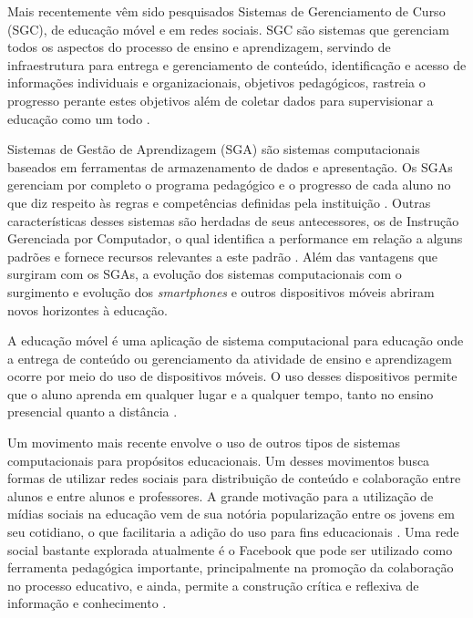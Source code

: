 Mais recentemente vêm sido pesquisados Sistemas de Gerenciamento de Curso (SGC), de educação móvel e em redes sociais. SGC são sistemas que gerenciam todos os aspectos do processo de ensino e aprendizagem, servindo de infraestrutura para entrega e gerenciamento de conteúdo, identificação e acesso de informações individuais e organizacionais, objetivos pedagógicos, rastreia o progresso perante estes objetivos além de coletar dados para supervisionar a educação como um todo \cite{flescher02}.

Sistemas de Gestão de Aprendizagem (SGA) são sistemas computacionais baseados em ferramentas de armazenamento de dados e apresentação. Os SGAs gerenciam por completo o programa pedagógico e o progresso de cada aluno no que diz respeito às regras e competências definidas pela instituição \cite{flescher02}. Outras características desses sistemas são herdadas de seus antecessores, os de Instrução Gerenciada por Computador, o qual identifica a performance em relação a alguns padrões e fornece recursos relevantes a este padrão \cite{flescher02}. Além das vantagens que surgiram com os SGAs, a evolução dos sistemas computacionais com o surgimento e evolução dos \emph{smartphones} e outros dispositivos móveis abriram novos horizontes à educação.


A educação móvel é uma aplicação de sistema computacional para educação onde a entrega de conteúdo ou gerenciamento da atividade de ensino e aprendizagem ocorre por meio do uso de dispositivos móveis. O uso desses dispositivos permite que o aluno aprenda em qualquer lugar e a qualquer tempo, tanto no ensino presencial quanto a distância \cite{mlearning09}.

Um movimento mais recente envolve o uso de outros tipos de sistemas computacionais para propósitos educacionais. Um desses movimentos busca formas de utilizar redes sociais para distribuição de conteúdo e colaboração entre alunos e entre alunos e professores. A grande motivação para a utilização de mídias sociais na educação vem de sua notória popularização entre os jovens em seu cotidiano, o que facilitaria a adição do uso para fins educacionais \cite{dotta_uso_2011}. Uma rede social bastante explorada atualmente é o Facebook que pode ser utilizado como ferramenta pedagógica importante, principalmente na promoção da colaboração no processo educativo, e ainda, permite a construção crítica e reflexiva de informação e conhecimento \cite{facebook11}.

